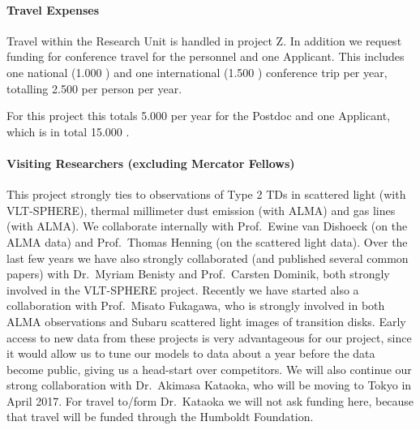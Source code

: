 \documentclass[10pt,fleqn,twoside,a4paper]{article}
\begin{document}
\paragraph{Travel Expenses}

Travel within the Research Unit is handled in project Z. In addition we
request funding for conference travel for the personnel and one Applicant.
This includes one national (1.000 \EUR{}) and one international (1.500 \EUR{})
conference trip per year, totalling 2.500 \EUR{} per person per year. 

For this project this totals 5.000 \EUR{} per year for the Postdoc
and one Applicant, which is in total 15.000 \EUR{}.


\paragraph{Visiting Researchers (excluding Mercator Fellows)}
This project strongly ties to observations of Type 2 TDs in scattered light
(with VLT-SPHERE), thermal millimeter dust emission (with ALMA) and gas
lines (with ALMA). We collaborate internally with Prof.~Ewine van Dishoeck
(on the ALMA data) and Prof.~Thomas Henning (on the scattered light data).
Over the last few years we have also strongly collaborated (and published
several common papers) with Dr.~Myriam Benisty and Prof.~Carsten Dominik,
both strongly involved in the VLT-SPHERE project. Recently we have started
also a collaboration with Prof.~Misato Fukagawa, who is strongly involved in
both ALMA observations and Subaru scattered light images of transition
disks. Early access to new data from these projects is very advantageous for
our project, since it would allow us to tune our models to data about a year
before the data become public, giving us a head-start over competitors.  We
will also continue our strong collaboration with Dr.~Akimasa Kataoka, who
will be moving to Tokyo in April 2017. For travel to/form Dr.~Kataoka we
will not ask funding here, because that travel will be funded through the
Humboldt Foundation.
\end{document}
